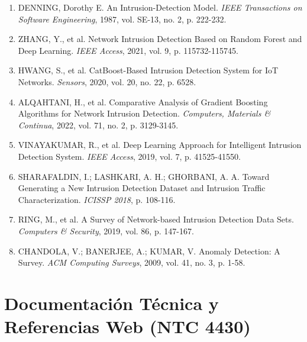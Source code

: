 \documentclass[12pt,letterpaper]{report}
\begin{document}
\begin{enumerate}[label=\arabic*., ref=\arabic*]
  \item DENNING, Dorothy E. An Intrusion-Detection Model. \textit{IEEE Transactions on Software Engineering}, 1987, vol. SE-13, no. 2, p. 222-232.
  
  \item ZHANG, Y., et al. Network Intrusion Detection Based on Random Forest and Deep Learning. \textit{IEEE Access}, 2021, vol. 9, p. 115732-115745.
  
  \item HWANG, S., et al. CatBoost-Based Intrusion Detection System for IoT Networks. \textit{Sensors}, 2020, vol. 20, no. 22, p. 6528.
  
  \item ALQAHTANI, H., et al. Comparative Analysis of Gradient Boosting Algorithms for Network Intrusion Detection. \textit{Computers, Materials \& Continua}, 2022, vol. 71, no. 2, p. 3129-3145.
  
  \item VINAYAKUMAR, R., et al. Deep Learning Approach for Intelligent Intrusion Detection System. \textit{IEEE Access}, 2019, vol. 7, p. 41525-41550.
  
  \item SHARAFALDIN, I.; LASHKARI, A. H.; GHORBANI, A. A. Toward Generating a New Intrusion Detection Dataset and Intrusion Traffic Characterization. \textit{ICISSP 2018}, p. 108-116.
  
  \item RING, M., et al. A Survey of Network-based Intrusion Detection Data Sets. \textit{Computers \& Security}, 2019, vol. 86, p. 147-167.
  
  \item CHANDOLA, V.; BANERJEE, A.; KUMAR, V. Anomaly Detection: A Survey. \textit{ACM Computing Surveys}, 2009, vol. 41, no. 3, p. 1-58.
\end{enumerate}

\section*{Documentación Técnica y Referencias Web (NTC 4430)}
\end{document}
